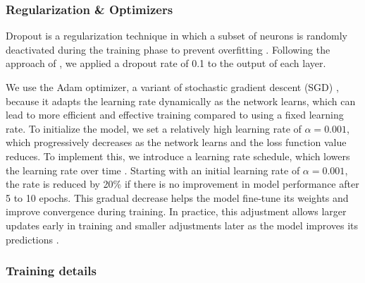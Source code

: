 
\subsubsection{Regularization \& Optimizers}
\label{sec:regularization}
Dropout is a regularization technique in which a subset of neurons is randomly deactivated during the training phase to prevent overfitting \citep{srivastava2014dropout}. Following the approach of \citet{vaswani2017attention}, we applied a dropout rate of 0.1 to the output of each layer. \par

We use the Adam optimizer, a variant of stochastic gradient descent (SGD) \citep{kingma2014adam}, because it adapts the learning rate dynamically as the network learns, which can lead to more efficient and effective training compared to using a fixed learning rate. To initialize the model, we set a relatively high learning rate of $\alpha = 0.001$, which progressively decreases as the network learns and the loss function value reduces. To implement this, we introduce a learning rate schedule, which lowers the learning rate over time \citep{goodfellow2016deep}. Starting with an initial learning rate of $\alpha = 0.001$, the rate is reduced by 20\% if there is no improvement in model performance after 5 to 10 epochs. This gradual decrease helps the model fine-tune its weights and improve convergence during training. In practice, this adjustment allows larger updates early in training and smaller adjustments later as the model improves its predictions \citep{goodfellow2016deep}. \par


\subsubsection{Training details}

